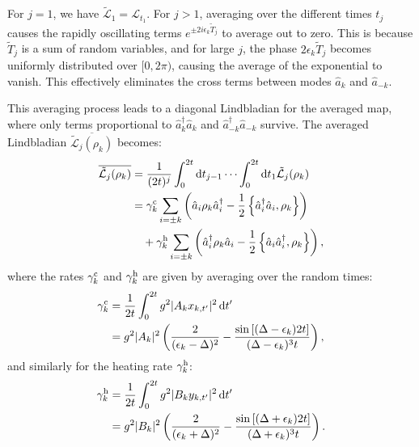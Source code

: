 For $j = 1$, we have $\tilde{\mathcal{L}}_1 = \mathcal{L}_{t_1}$. For $j > 1$, averaging over the different times $t_j$ causes the rapidly oscillating terms $e^{\pm 2i \epsilon_k \tilde{T}_j}$ to average out to zero.
This is because $\tilde{T}_j$ is a sum of random variables, and for large $j$, the phase $2\epsilon_k \tilde{T}_j$ becomes uniformly distributed over $[0, 2\pi)$, causing the average of the exponential to vanish.
This effectively eliminates the cross terms between modes $\hat{a}_k$ and $\hat{a}_{-k}$.

This averaging process leads to a diagonal Lindbladian for the averaged map, where only terms proportional to $\hat{a}_k^\dag \hat{a}_k$ and $\hat{a}_{-k}^\dag \hat{a}_{-k}$ survive. The averaged Lindbladian $\overline{\tilde{\mathcal{L}}_{j}(\rho_k)}$ becomes:
\begin{align}
    \overline{\tilde{\mathcal{L}}_{j}(\rho_k)}
     &= \frac{1}{(2t)^j} \int_{0}^{2t} \mathop{}\!\mathrm{d} t_{j - 1} \cdots \int_{0}^{2t} \mathop{}\!\mathrm{d} t_1 \tilde{\mathcal{L}}_j(\rho_k)\nonumber\\
     &= \gamma_k^{\rm c} \sum_{i=\pm k} \left( \hat{a}_i \rho_k \hat{a}_i^\dag - \frac{1}{2} \left\{ \hat{a}_i^\dag \hat{a}_i, \rho_k \right\} \right) \nonumber\\
     &\quad + \gamma_k^{\rm h} \sum_{i=\pm k} \left( \hat{a}_i^\dag \rho_k \hat{a}_i - \frac{1}{2} \left\{ \hat{a}_i \hat{a}_i^\dag, \rho_k \right\} \right),
    \label{eq:averaged_lindbladian}
\end{align}
where the rates $\gamma_k^{\rm c}$ and $\gamma_k^{\rm h}$ are given by averaging over the random times:
\begin{align}
    \gamma_k^{\rm c} &= \frac{1}{2t} \int_0^{2t} g^2 |A_k x_{k,t'}|^2 \mathop{}\!\mathrm{d} t'\nonumber\\
                     &= g^2|A_k|^2 \left(\frac{2}{(\epsilon_k - \Delta)^2}-\frac{\sin\left[(\Delta-\epsilon_k)2t\right]}{(\Delta-\epsilon_k)^3t}\right),
\end{align}
and similarly for the heating rate $\gamma_k^{\rm h}$:
\begin{align}
    \gamma_k^{\rm h} &= \frac{1}{2t} \int_0^{2t} g^2 |B_k y_{k,t'}|^2 \mathop{}\!\mathrm{d} t'\nonumber\\
                     &= g^2|B_k|^2 \left(\frac{2}{(\epsilon_k + \Delta)^2}-\frac{\sin\left[(\Delta+\epsilon_k)2t\right]}{(\Delta+\epsilon_k)^3t}\right).
\end{align}

